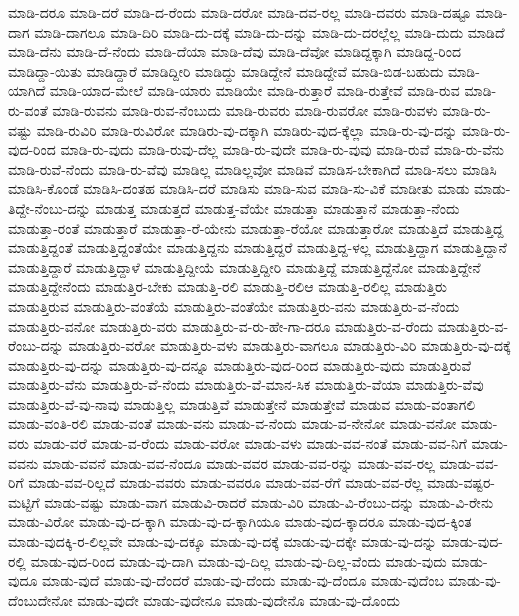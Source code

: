 {ಮಾಡಿ-ದರೂ
ಮಾಡಿ-ದರೆ
ಮಾಡಿ-ದ-ರೆಂದು
ಮಾಡಿ-ದರೋ
ಮಾಡಿ-ದವ-ರಲ್ಲ
ಮಾಡಿ-ದವರು
ಮಾಡಿ-ದಷ್ಟೂ
ಮಾಡಿ-ದಾಗ
ಮಾಡಿ-ದಾಗಲೂ
ಮಾಡಿ-ದಿರಿ
ಮಾಡಿ-ದು-ದಕ್ಕೆ
ಮಾಡಿ-ದು-ದನ್ನು
ಮಾಡಿ-ದು-ದರಲ್ಲೆಲ್ಲ
ಮಾಡಿ-ದುದು
ಮಾಡಿದೆ
ಮಾಡಿ-ದೆನು
ಮಾಡಿ-ದೆ-ನೆಂದು
ಮಾಡಿ-ದೆಯಾ
ಮಾಡಿ-ದೆವು
ಮಾಡಿ-ದೆವೋ
ಮಾಡಿದ್ದಕ್ಕಾಗಿ
ಮಾಡಿದ್ದ-ರಿಂದ
ಮಾಡಿದ್ದಾ-ಯಿತು
ಮಾಡಿದ್ದಾರೆ
ಮಾಡಿದ್ದೀರಿ
ಮಾಡಿದ್ದು
ಮಾಡಿದ್ದೇನೆ
ಮಾಡಿದ್ದೇವೆ
ಮಾಡಿ-ಬಿಡ-ಬಹುದು
ಮಾಡಿ-ಯಾಗಿದೆ
ಮಾಡಿ-ಯಾದ-ಮೇಲೆ
ಮಾಡಿ-ಯಾರು
ಮಾಡಿಯೇ
ಮಾಡಿ-ರುತ್ತಾರೆ
ಮಾಡಿ-ರುತ್ತೇವೆ
ಮಾಡಿ-ರುವ
ಮಾಡಿ-ರು-ವಂತೆ
ಮಾಡಿ-ರುವನು
ಮಾಡಿ-ರುವ-ನೆಂಬುದು
ಮಾಡಿ-ರುವರು
ಮಾಡಿ-ರುವರೋ
ಮಾಡಿ-ರುವಳು
ಮಾಡಿ-ರು-ವಷ್ಟು
ಮಾಡಿ-ರುವಿರಿ
ಮಾಡಿ-ರುವಿರೋ
ಮಾಡಿರು-ವು-ದಕ್ಕಾಗಿ
ಮಾಡಿರು-ವುದ-ಕ್ಕೆಲ್ಲಾ
ಮಾಡಿ-ರು-ವು-ದನ್ನು
ಮಾಡಿ-ರು-ವುದ-ರಿಂದ
ಮಾಡಿ-ರು-ವುದು
ಮಾಡಿ-ರುವು-ದೆಲ್ಲ
ಮಾಡಿ-ರು-ವುದೇ
ಮಾಡಿ-ರು-ವುವು
ಮಾಡಿ-ರುವೆ
ಮಾಡಿ-ರು-ವೆನು
ಮಾಡಿ-ರುವೆ-ನೆಂದು
ಮಾಡಿ-ರು-ವೆವು
ಮಾಡಿಲ್ಲ
ಮಾಡಿಲ್ಲವೋ
ಮಾಡಿವೆ
ಮಾಡಿಸ-ಬೇಕಾಗಿದೆ
ಮಾಡಿ-ಸಲು
ಮಾಡಿಸಿ
ಮಾಡಿಸಿ-ಕೊಂಡೆ
ಮಾಡಿಸಿ-ದಂತಹ
ಮಾಡಿಸಿ-ದರೆ
ಮಾಡಿಸು
ಮಾಡಿ-ಸುವ
ಮಾಡಿ-ಸು-ವಿಕೆ
ಮಾಡೀತು
ಮಾಡು
ಮಾಡು-ತಿದ್ದೇ-ನೆಂಬು-ದನ್ನು
ಮಾಡುತ್ತ
ಮಾಡುತ್ತದೆ
ಮಾಡುತ್ತ-ವೆಯೇ
ಮಾಡುತ್ತಾ
ಮಾಡುತ್ತಾನೆ
ಮಾಡುತ್ತಾ-ನೆಂದು
ಮಾಡುತ್ತಾ-ರಂತೆ
ಮಾಡುತ್ತಾರೆ
ಮಾಡುತ್ತಾ-ರೆ-ಯೇನು
ಮಾಡುತ್ತಾ-ರೆಯೋ
ಮಾಡುತ್ತಾರೋ
ಮಾಡುತ್ತಿದೆ
ಮಾಡುತ್ತಿದ್ದ
ಮಾಡುತ್ತಿದ್ದಂತೆ
ಮಾಡುತ್ತಿದ್ದಂತೆಯೇ
ಮಾಡುತ್ತಿದ್ದನು
ಮಾಡುತ್ತಿದ್ದರೆ
ಮಾಡುತ್ತಿದ್ದ-ಳಲ್ಲ
ಮಾಡುತ್ತಿದ್ದಾಗ
ಮಾಡುತ್ತಿದ್ದಾನೆ
ಮಾಡುತ್ತಿದ್ದಾರೆ
ಮಾಡುತ್ತಿದ್ದಾಳೆ
ಮಾಡುತ್ತಿದ್ದೀಯೆ
ಮಾಡುತ್ತಿದ್ದೀರಿ
ಮಾಡುತ್ತಿದ್ದೆ
ಮಾಡುತ್ತಿದ್ದೆನೋ
ಮಾಡುತ್ತಿದ್ದೇನೆ
ಮಾಡುತ್ತಿದ್ದೇನೆಂದು
ಮಾಡುತ್ತಿರ-ಬೇಕು
ಮಾಡುತ್ತಿ-ರಲಿ
ಮಾಡುತ್ತಿ-ರಲಿಆ
ಮಾಡುತ್ತಿ-ರಲಿಲ್ಲ
ಮಾಡುತ್ತಿರು
ಮಾಡುತ್ತಿರುವ
ಮಾಡುತ್ತಿರು-ವಂತೆಯೆ
ಮಾಡುತ್ತಿರು-ವಂತೆಯೇ
ಮಾಡುತ್ತಿರು-ವನು
ಮಾಡುತ್ತಿರು-ವ-ನೆಂದು
ಮಾಡುತ್ತಿರು-ವನೋ
ಮಾಡುತ್ತಿರು-ವರು
ಮಾಡುತ್ತಿರು-ವ-ರು-ಹೇ-ಗಾ-ದರೂ
ಮಾಡುತ್ತಿರು-ವ-ರೆಂದು
ಮಾಡುತ್ತಿರು-ವ-ರೆಂಬು-ದನ್ನು
ಮಾಡುತ್ತಿರು-ವರೋ
ಮಾಡುತ್ತಿರು-ವಳು
ಮಾಡುತ್ತಿರು-ವಾಗಲೂ
ಮಾಡುತ್ತಿರು-ವಿರಿ
ಮಾಡುತ್ತಿರು-ವು-ದಕ್ಕೆ
ಮಾಡುತ್ತಿರು-ವು-ದನ್ನು
ಮಾಡುತ್ತಿರು-ವು-ದನ್ನೂ
ಮಾಡುತ್ತಿರು-ವುದ-ರಿಂದ
ಮಾಡುತ್ತಿರು-ವುದು
ಮಾಡುತ್ತಿರುವೆ
ಮಾಡುತ್ತಿರು-ವೆನು
ಮಾಡುತ್ತಿರು-ವೆ-ನೆಂದು
ಮಾಡುತ್ತಿರು-ವೆ-ಮಾನ-ಸಿಕ
ಮಾಡುತ್ತಿರು-ವೆಯಾ
ಮಾಡುತ್ತಿರು-ವೆವು
ಮಾಡುತ್ತಿರು-ವೆ-ವು-ನಾವು
ಮಾಡುತ್ತಿಲ್ಲ
ಮಾಡುತ್ತಿವೆ
ಮಾಡುತ್ತೇನೆ
ಮಾಡುತ್ತೇವೆ
ಮಾಡುವ
ಮಾಡು-ವಂತಾಗಲಿ
ಮಾಡು-ವಂತಿ-ರಲಿ
ಮಾಡು-ವಂತೆ
ಮಾಡು-ವನು
ಮಾಡು-ವ-ನೆಂದು
ಮಾಡು-ವ-ನೇನೋ
ಮಾಡು-ವನೋ
ಮಾಡು-ವರು
ಮಾಡು-ವರೆ
ಮಾಡು-ವ-ರೆಂದು
ಮಾಡು-ವರೋ
ಮಾಡು-ವಳು
ಮಾಡು-ವವ-ನಂತೆ
ಮಾಡು-ವವ-ನಿಗೆ
ಮಾಡು-ವವನು
ಮಾಡು-ವವನೆ
ಮಾಡು-ವವ-ನೆಂದೂ
ಮಾಡು-ವವರ
ಮಾಡು-ವವ-ರನ್ನು
ಮಾಡು-ವವ-ರಲ್ಲ
ಮಾಡು-ವವ-ರಿಗೆ
ಮಾಡು-ವವ-ರಿಲ್ಲದೆ
ಮಾಡು-ವವರು
ಮಾಡು-ವವರೂ
ಮಾಡು-ವವ-ರೆಗೆ
ಮಾಡು-ವವ-ರೆಲ್ಲ
ಮಾಡು-ವಷ್ಟರ-ಮಟ್ಟಿಗೆ
ಮಾಡು-ವಷ್ಟು
ಮಾಡು-ವಾಗ
ಮಾಡುವಿ-ರಾದರೆ
ಮಾಡು-ವಿರಿ
ಮಾಡು-ವಿ-ರೆಂಬು-ದನ್ನು
ಮಾಡು-ವಿ-ರೇನು
ಮಾಡು-ವಿರೋ
ಮಾಡು-ವು-ದ-ಕ್ಕಾಗಿ
ಮಾಡು-ವು-ದ-ಕ್ಕಾಗಿಯೂ
ಮಾಡು-ವುದ-ಕ್ಕಾದರೂ
ಮಾಡು-ವುದ-ಕ್ಕಿಂತ
ಮಾಡು-ವುದಕ್ಕಿ-ರ-ಲಿಲ್ಲವೇ
ಮಾಡು-ವು-ದಕ್ಕೂ
ಮಾಡು-ವು-ದಕ್ಕೆ
ಮಾಡು-ವು-ದಕ್ಕೇ
ಮಾಡು-ವು-ದನ್ನು
ಮಾಡು-ವುದ-ರಲ್ಲಿ
ಮಾಡು-ವುದ-ರಿಂದ
ಮಾಡು-ವು-ದಾಗಿ
ಮಾಡು-ವು-ದಿಲ್ಲ
ಮಾಡು-ವು-ದಿಲ್ಲ-ವೆಂದು
ಮಾಡು-ವುದು
ಮಾಡು-ವುದೂ
ಮಾಡು-ವುದೆ
ಮಾಡು-ವು-ದೆಂದರೆ
ಮಾಡು-ವು-ದೆಂದು
ಮಾಡು-ವು-ದೆಂದೂ
ಮಾಡು-ವುದೆಂಬ
ಮಾಡು-ವು-ದೆಂಬುದೇನೋ
ಮಾಡು-ವುದೇ
ಮಾಡು-ವುದೇನೂ
ಮಾಡು-ವುದೇನೊ
ಮಾಡು-ವು-ದೊಂದು
}
